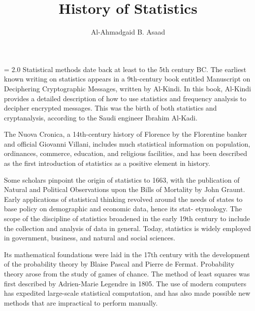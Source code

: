 \documentclass[12pt]{article}
\title{History of Statistics}
\author{Al-Ahmadgaid B. Asaad}
\begin{document}
\maketitle
{\baselineskip = 2.0\baselineskip
Statistical methods date back at least to the 5th century BC.
The earliest known writing on statistics appears in a 9th-century
book entitled Manuscript on Deciphering Cryptographic Messages,
written by Al-Kindi. In this book, Al-Kindi provides a detailed
description of how to use statistics and frequency analysis to
decipher encrypted messages. This was the birth of both statistics
and cryptanalysis, according to the Saudi engineer Ibrahim Al-Kadi.
 
}
 
The Nuova Cronica, a 14th-century history of Florence by the
Florentine banker and official Giovanni Villani, includes much
statistical information on population, ordinances, commerce,
education, and religious facilities, and has been described as
the first introduction of statistics as a positive element in history.
 
Some scholars pinpoint the origin of statistics to 1663, with
the publication of Natural and Political Observations upon the
Bills of Mortality by John Graunt. Early applications of statistical
thinking revolved around the needs of states to base policy on
demographic and economic data, hence its stat- etymology. The scope
of the discipline of statistics broadened in the early 19th century
to include the collection and analysis of data in general. Today,
statistics is widely employed in government, business, and natural
and social sciences.
 
Its mathematical foundations were laid in the 17th century with the
development of the probability theory by Blaise Pascal and Pierre
de Fermat. Probability theory arose from the study of games of chance.
The method of least squares was first described by Adrien-Marie Legendre
in 1805. The use of modern computers has expedited large-scale statistical
computation, and has also made possible new methods that are impractical
to perform manually.
\end{document}
